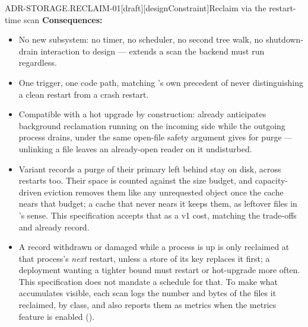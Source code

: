 \begin{requirement}{ADR-STORAGE.RECLAIM-01}[draft][designConstraint]{Reclaim via the restart-time scan}
  \textbf{Consequences:}
  \begin{itemize}
    \item[+] No new subsystem: no timer, no scheduler, no second tree walk,
      no shutdown-drain interaction to design --- extends a scan the
      backend must run regardless.
    \item[+] One trigger, one code path, matching
      's own precedent of never
      distinguishing a clean restart from a crash restart.
    \item[+] Compatible with a hot upgrade by construction:
       already anticipates background
      reclamation running on the incoming side while the outgoing process
      drains, under the same open-file safety
      argument  gives for purge --- unlinking
      a file leaves an already-open reader on it undisturbed.
    \item[--] Variant records a purge of their primary left behind stay on
      disk, across restarts too. Their space is counted against the size
      budget, and capacity-driven eviction removes them like any unrequested
      object once the cache nears that budget; a cache that never nears it
      keeps them, as leftover files in 's
      sense. This specification accepts that as a v1 cost, matching the
      trade-offs  and
       already record.
    \item[--] A record withdrawn or damaged while a process is up is only
      reclaimed at that process's \emph{next} restart, unless a store of its
      key replaces it first; a deployment wanting a tighter bound must
      restart or hot-upgrade more often. This specification does not
      mandate a schedule for that. To make what accumulates visible, each
      scan logs the number and bytes of the files it reclaimed, by class,
      and also reports them as metrics when the metrics feature is enabled
      ().
  \end{itemize}



\end{requirement}


